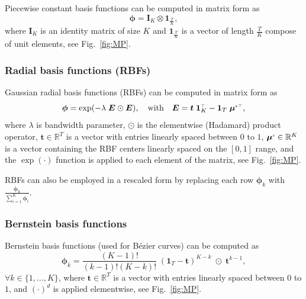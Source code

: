 \documentclass[10pt,a4paper]{article} %
\newcommand{\trsp}{{\scriptscriptstyle\top}}
\newcommand{\tp}[1]{\text{\tiny#1}}
\begin{document}
Piecewise constant basis functions can be computed in matrix form as
\begin{equation}
	\bm{\phi} = \bm{I}_K \otimes \bm{1}_{\frac{T}{K}},
\end{equation}
where $\bm{I}_K$ is an identity matrix of size $K$ and $\bm{1}_{\frac{T}{K}}$ is a vector of length $\frac{T}{K}$ compose of unit elements, see Fig.~\ref{fig:MP}.


\subsubsection*{Radial basis functions (RBFs)}

Gaussian radial basis functions (RBFs) can be computed in matrix form as
\begin{equation}
	\bm{\phi} = \exp(-\lambda \; \bm{E} \odot \bm{E}),
	\quad\text{with}\quad \bm{E} = \bm{t} \; \bm{1}_K^\trsp - \bm{1}_T \; {\bm{\mu}^\tp{s}}^\trsp,
\end{equation}
where $\lambda$ is bandwidth parameter, $\odot$ is the elementwise (Hadamard) product operator, $\bm{t}\in\mathbb{R}^T$ is a vector with entries linearly spaced between $0$ to $1$, $\bm{\mu}^\tp{s}\in\mathbb{R}^K$ is a vector containing the RBF centers linearly spaced on the $[0,1]$ range, and the $\exp(\cdot)$ function is applied to each element of the matrix, see Fig.~\ref{fig:MP}. 

RBFs can also be employed in a rescaled form by replacing each row $\bm{\phi}_k$ with $\frac{\bm{\phi}_k}{\sum_{i=1}^K\bm{\phi}_i}$.




\subsubsection*{Bernstein basis functions}

Bernstein basis functions (used for B\'ezier curves) can be computed as
\begin{equation}
	\bm{\phi}_k = \frac{(K-1)!}{(k-1)!(K-k)!} \; {(\bm{1}_T-\bm{t})}^{K-k} \;\odot\; \bm{t}^{k-1},
\end{equation}
$\forall k\in\{1,\ldots,K\}$, where $\bm{t}\in\mathbb{R}^T$ is a vector with entries linearly spaced between $0$ to $1$, and $(\cdot)^d$ is applied elementwise, see Fig.~\ref{fig:MP}.
\end{document}
